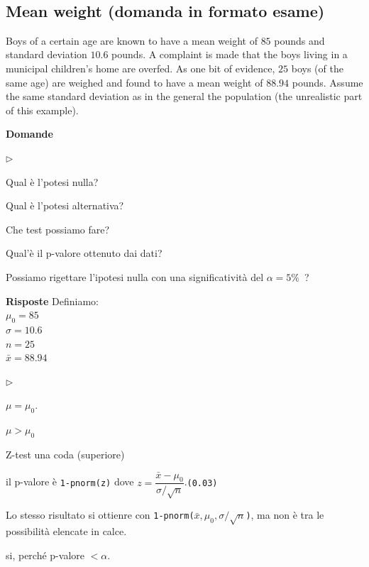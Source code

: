 \documentclass[11pt,openany]{book}
\newcommand{\mylabel}[1]{{\footnotesize\textsf{#1}}\hfill}
\renewenvironment{itemize}
  {\begin{list}{$\triangleright$}{%
   \setlength{\parskip}{0mm}
   \setlength{\topsep}{.2\baselineskip}
   \setlength{\rightmargin}{0mm}
   \setlength{\listparindent}{0mm}
   \setlength{\itemindent}{0mm}
   \setlength{\labelwidth}{3ex}
   \setlength{\itemsep}{.4\baselineskip}
   \setlength{\parsep}{0mm}
   \setlength{\partopsep}{0mm}
   \setlength{\labelsep}{1ex}
   \setlength{\leftmargin}{\labelwidth+\labelsep}
   \let\makelabel\mylabel}}{%
   \end{list}\vspace*{-1.3mm}}
\begin{document}
\hfill{}\clearpage\
\subsection{Mean weight (domanda in formato esame)}

Boys of a certain age are known to have a mean weight of $85$ pounds and standard deviation $10.6$ pounds. A complaint is made that the boys living in a municipal children's home are overfed. As one bit of evidence, $25$ boys (of the same age) are weighed and found to have a mean weight of $88.94$ pounds. Assume the same standard deviation as in the general the population (the unrealistic part of this example).


\textbf{Domande}

\begin{itemize}
\item[1.] Qual è l'potesi nulla?

\item[2.] Qual è l'potesi alternativa?

\item[3.] Che test possiamo fare?

\item[4.] Qual'è il p-valore ottenuto dai dati?

\item[5.] Possiamo rigettare l'ipotesi nulla con una significatività del $\alpha=5\%$~?
\end{itemize}

\textbf{Risposte} Definiamo:\\
$\mu_0=85$\\
$\sigma=10.6$\\
$n=25$\\
$\bar x=88.94$
\begin{itemize}
\item[1.] $\mu=\mu_0$.
\item[2.] $\mu>\mu_0$ 
\item[3.] Z-test una coda (superiore)
\item[4.] il p-valore è {\tt 1-pnorm(z)} dove $z=\dfrac{\bar x-\mu_0}{\sigma/\sqrt{n}}$.\hfill {\tt (0.03)}

Lo stesso risultato si ottienre con {\tt 1-pnorm($\bar x,\mu_0,\sigma/\sqrt{n}$)}, ma non è tra le possibilità elencate in calce.
\item[5.] si, perché  p-valore $<\alpha$.
\end{itemize}
\end{document}
